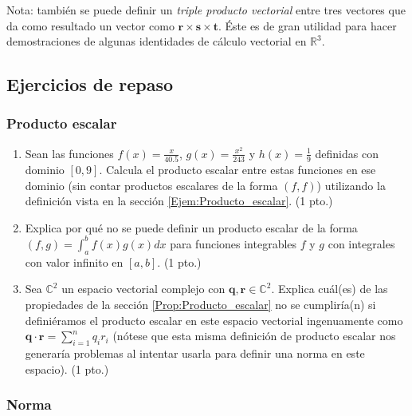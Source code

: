 \documentclass[12pt]{article}
\begin{document}
Nota: también se puede definir un \emph{triple producto vectorial} entre tres vectores que da como resultado un vector como $\mathbf{r}\times\mathbf{s}\times\mathbf{t}$. Éste es de gran utilidad para hacer demostraciones de algunas identidades de cálculo vectorial en $\mathbb{R}^3$.

\subsection{Ejercicios de repaso}

\subsubsection{Producto escalar} \label{Ejer:Producto_escalar} 

\begin{enumerate}
\item Sean las funciones $f(x)=\frac{x}{40.5}$, $g(x)=\frac{x^2}{243}$ y $h(x)=\frac{1}{9}$ definidas con dominio $[0,9]$. Calcula el producto escalar entre estas funciones en ese dominio (sin contar productos escalares de la forma $(f,f)$) utilizando la definición vista en la sección \ref{Ejem:Producto_escalar}. (1 pto.)
    \item Explica por qué no se puede definir un producto escalar de la forma $(f,g)=\int_a^b f(x)g(x)dx$ para funciones integrables $f$ y $g$ con integrales con valor infinito en $[a,b]$. (1 pto.)
    \item Sea $\mathbb{C}^2$ un espacio vectorial complejo con $\mathbf{q},\mathbf{r}\in\mathbb{C}^2$. Explica cuál(es) de las propiedades de la sección \ref{Prop:Producto_escalar} no se cumpliría(n) si definiéramos el producto escalar en este espacio vectorial ingenuamente como $\mathbf{q}\cdot\mathbf{r}=\sum_{i=1}^n q_ir_i$ (nótese que esta misma definición de producto escalar nos generaría problemas al intentar usarla para definir una norma en este espacio). (1 pto.)
\end{enumerate}

\subsubsection{Norma} \label{Ejer:Norma}
\end{document}
